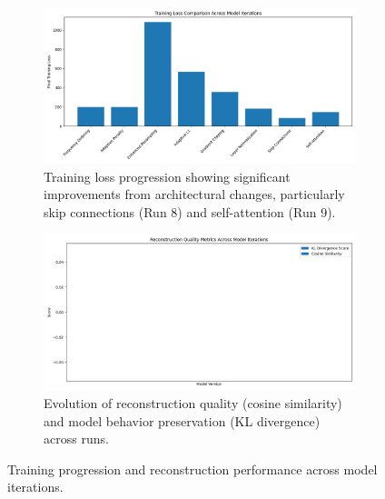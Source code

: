 \documentclass{article} %
\begin{document}
\begin{figure}[h]
    \centering
    \begin{subfigure}{0.49\textwidth}
        \includegraphics[width=\textwidth]{training_loss_comparison.png}
        \caption{Training loss progression showing significant improvements from architectural changes, particularly skip connections (Run 8) and self-attention (Run 9).}
        \label{fig:training_metrics}
    \end{subfigure}
    \hfill
    \begin{subfigure}{0.49\textwidth}
        \includegraphics[width=\textwidth]{reconstruction_metrics.png}
        \caption{Evolution of reconstruction quality (cosine similarity) and model behavior preservation (KL divergence) across runs.}
        \label{fig:reconstruction_metrics}
    \end{subfigure}
    \caption{Training progression and reconstruction performance across model iterations.}
    \label{fig:main_results}
\end{figure}
\end{document}

